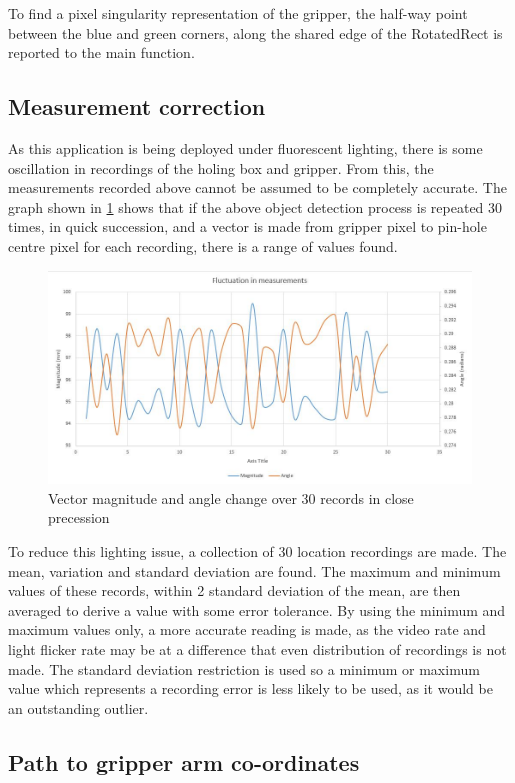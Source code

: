 \documentclass[11pt,a4paper, margin=1in]{report}
\begin{document}
To find a pixel singularity representation of the gripper, the half-way point between the blue and green corners, along the shared edge of the RotatedRect is reported to the main function.\\


\subsection{Measurement correction} \label{mean}
As this application is being deployed under fluorescent lighting, there is some oscillation in recordings of the holing box and gripper. From this, the measurements recorded above cannot be assumed to be completely accurate. The graph shown in \cref{fig:measumrnetflux} shows that if the above object detection process is repeated 30 times, in quick succession, and a vector is made from gripper pixel to pin-hole centre pixel for each recording, there is a range of values found.\\ 

\begin{figure}[h]
\centering
\includegraphics[width=0.7\linewidth]{measumrnetflux}
\caption{Vector magnitude and angle change over 30 records in close precession}
\label{fig:measumrnetflux}
\end{figure}
To reduce this lighting issue, a collection of 30 location recordings are made. The mean, variation and standard deviation are found. The maximum and minimum values of these records, within 2 standard deviation of the mean, are then averaged to derive a value with some error tolerance. By using the minimum and maximum values only, a more accurate reading is made, as the video rate and light flicker rate may be at a difference that even distribution of recordings is not made. The standard deviation restriction is used so a minimum or maximum value which represents a recording error is less likely to be used, as it would be an outstanding outlier.   
 
\subsection{Path to gripper arm co-ordinates}
\end{document}

